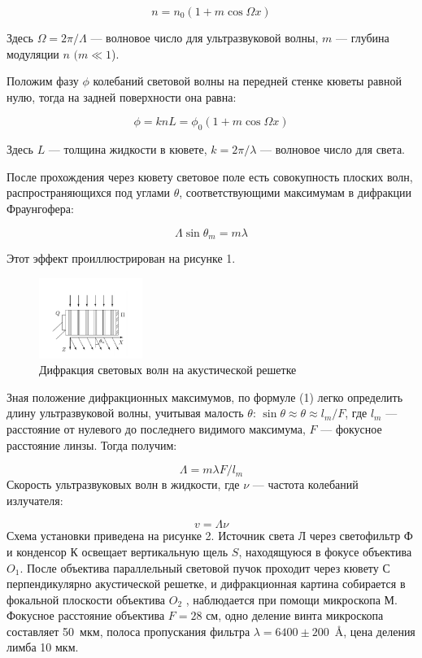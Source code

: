 \documentclass[a4paper, 12pt]{article}%
\begin{document}
	\begin{equation}\label{}
		n = n_0 (1 + m \cos \Omega x)
	\end{equation}
	
	Здесь $ \Omega = 2 \pi / \Lambda $ --- волновое число для ультразвуковой волны, $ m $ --- глубина модуляции $ n $ $ (m \ll 1 $).
	
	Положим фазу $ \phi $ колебаний световой волны на передней стенке кюветы равной нулю, тогда на задней поверхности она равна:
	
	\begin{equation}\label{}
		\phi  = k n L = \phi_0 (1 + m \cos \Omega x)
	\end{equation}
	
	Здесь $ L $ --- толщина жидкости в кювете, $ k = 2 \pi / \lambda $ --- волновое число для света.
	
	После прохождения через кювету световое поле есть совокупность плоских волн, распространяющихся под углами $ \theta $, соответствующими максимумам в дифракции Фраунгофера:
	
	\begin{equation}\label{}	
		\Lambda \sin \theta_m = m \lambda
	\end{equation}
	
	Этот эффект проиллюстрирован на рисунке 1.
	\begin{figure}[h!]
		\centering	
		\includegraphics[width=0.3\textwidth]{wave.png}
		\caption{Дифракция световых волн на акустической решетке}
		\label{diff}
	\end{figure}
	Зная положение дифракционных максимумов, по формуле (1) легко определить длину ультразвуковой волны, учитывая малость $ \theta $: $ \sin \theta \approx \theta \approx l_m /F  $, где $ l_m $ --- расстояние от нулевого до последнего видимого максимума, $ F $ --- фокусное расстояние линзы. Тогда получим:
	
	\begin{equation}\label{}
		\Lambda = m \lambda F/ l_m 
	\end{equation}
	Скорость ультразвуковых волн в жидкости, где $ \nu $ --- частота колебаний излучателя:
	
	\begin{equation}\label{}
		v = \Lambda \nu 
	\end{equation}
	Схема установки приведена на рисунке 2. Источник света Л через светофильтр Ф и конденсор К освещает вертикальную щель $ S $, находящуюся в фокусе объектива $ O_1 $. После объектива параллельный световой пучок проходит через кювету С перпендикулярно акустической решетке, и дифракционная картина собирается в фокальной плоскости объектива $ O_2 $ , наблюдается при помощи микроскопа М.
	Фокусное расстояние объектива $F = 28 $ см, одно деление винта микроскопа составляет 50~мкм, полоса пропускания фильтра \mbox{$\lambda = 6400\pm 200$ Å}, цена деления лимба 10 мкм.
	
\end{document}
